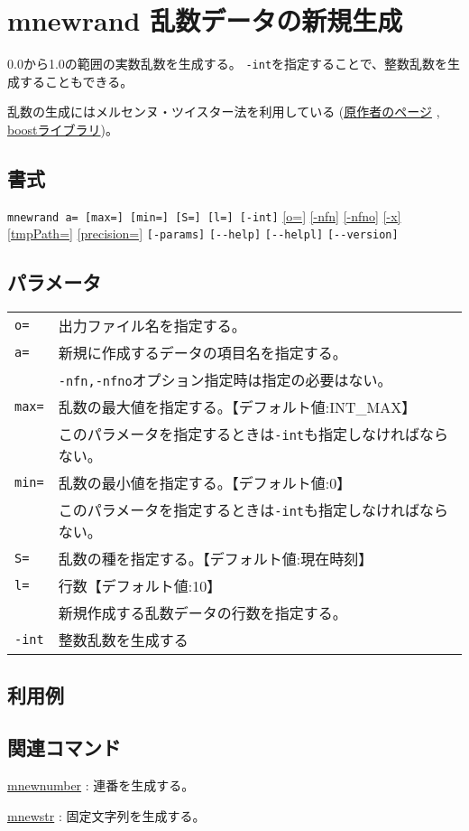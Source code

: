 
%

\section{mnewrand 乱数データの新規生成\label{sect:mnewrand}}
0.0から1.0の範囲の実数乱数を生成する。
\verb|-int|を指定することで、整数乱数を生成することもできる。

乱数の生成にはメルセンヌ・ツイスター法を利用している
(\href{http://www.math.sci.hiroshima-u.ac.jp/~m-mat/MT/emt.html}{原作者のページ}
, \href{http://www.boost.org/doc/libs/1_54_0/doc/html/boost_random.html}{boostライブラリ})。


\subsection*{書式}
\verb|mnewrand a= [max=] [min=] [S=] [l=] [-int]|
\hyperref[sect:option_o]{[o=]}
\hyperref[sect:option_nfn]{[-nfn]} 
\hyperref[sect:option_nfno]{[-nfno]}  
\hyperref[sect:option_x]{[-x]}
\hyperref[sect:option_option_tmppath]{[tmpPath=]}
\hyperref[sect:option_precision]{[precision=]}
\verb|[-params]|
\verb|[--help]|
\verb|[--helpl]|
\verb|[--version]|\\

\subsection*{パラメータ}
\begin{table}[htbp]
{\small
\begin{tabular}{ll}
\verb|o=|      & 出力ファイル名を指定する。\\
\verb|a=|      & 新規に作成するデータの項目名を指定する。\\
               & \verb|-nfn,-nfno|オプション指定時は指定の必要はない。\\
\verb|max=|    & 乱数の最大値を指定する。【デフォルト値:INT\_MAX】\\
               & このパラメータを指定するときは\verb|-int|も指定しなければならない。\\
\verb|min=|    & 乱数の最小値を指定する。【デフォルト値:0】\\
               & このパラメータを指定するときは\verb|-int|も指定しなければならない。\\
\verb|S=|      & 乱数の種を指定する。【デフォルト値:現在時刻】\\
\verb|l=|      & 行数【デフォルト値:10】\\
               & 新規作成する乱数データの行数を指定する。\\
\verb|-int|    & 整数乱数を生成する\\
\end{tabular} 
}
\end{table} 


\subsection*{利用例}


\subsection*{関連コマンド}
\hyperref[sect:mnewnumber] {mnewnumber} : 連番を生成する。

\hyperref[sect:mnewstr] {mnewstr} : 固定文字列を生成する。

%

